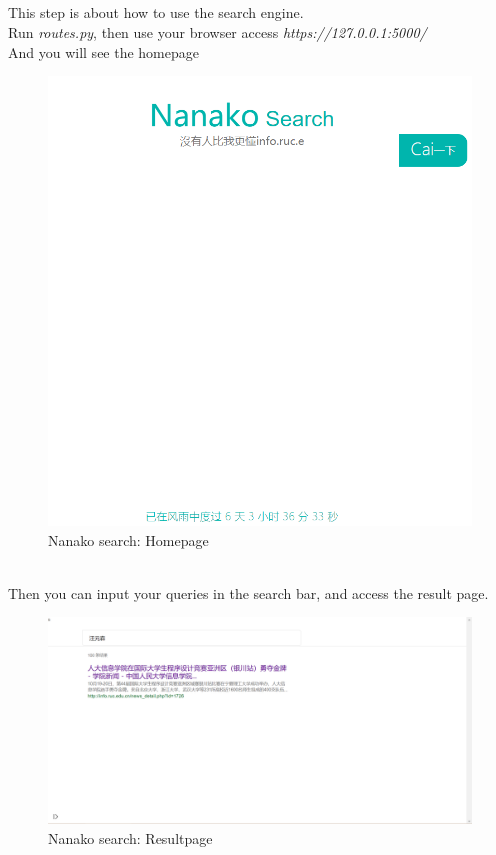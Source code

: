 \documentclass{article}
\begin{document}
\subsection{}
This step is about how to use the search engine.\\
\indent Run \emph{routes.py}, then use your browser access \emph{https://127.0.0.1:5000/}\\
\indent And you will see the homepage
\begin{figure}[h!]
\flushleft
\includegraphics[width=12.5cm]{homepage.png}
\caption{Nanako search: Homepage}
\end{figure}
\\
\indent Then you can input your queries in the search bar, and access the result page.
\begin{figure}[h!]
\flushleft
\includegraphics[width=12.5cm]{resultpage.png}
\caption{Nanako search: Resultpage}
\end{figure}
\end{document}
